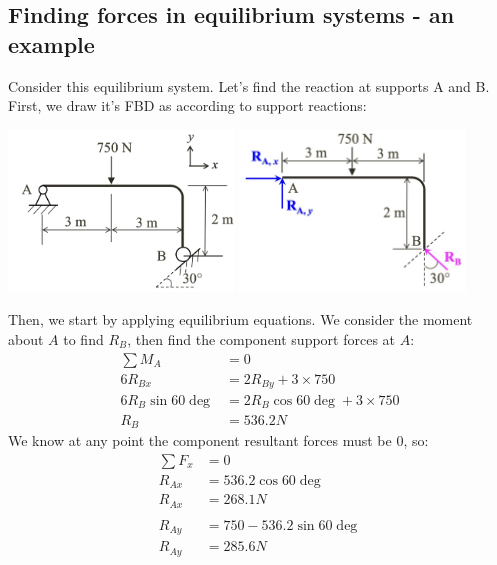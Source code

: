 \documentclass{article}
\begin{document}
\subsection{Finding forces in equilibrium systems - an example}
\begin{center}
    Consider this equilibrium system. Let's find the reaction at supports A and B. First, we draw it's FBD as according to support reactions:

    \includegraphics[width=0.45\textwidth]{./img/fbd1.png}
    \includegraphics[width=0.45\textwidth]{./img/fbd2.jpg}

    Then, we start by applying equilibrium equations. We consider the moment about $A$ to find $R_B$, then find the component support forces at $A$:
    \begin{align*}
        \sum M_A          & = 0                               \\
        6R_{Bx}           & = 2R_{By} + 3\times 750           \\
        6R_{B}\sin 60\deg & = 2R_{B}\cos 60\deg + 3\times 750 \\
        R_B               & = 536.2N
    \end{align*}
    We know at any point the component resultant forces must be 0, so:
    \begin{align*}
        \sum F_x & = 0                      \\
        R_{Ax}   & = 536.2\cos 60\deg       \\
        R_{Ax}   & = 268.1N                 \\
                 &                          \\
        R_{Ay}   & = 750 - 536.2\sin 60\deg \\
        R_{Ay}   & = 285.6N
    \end{align*}
\end{center}
\end{document}
